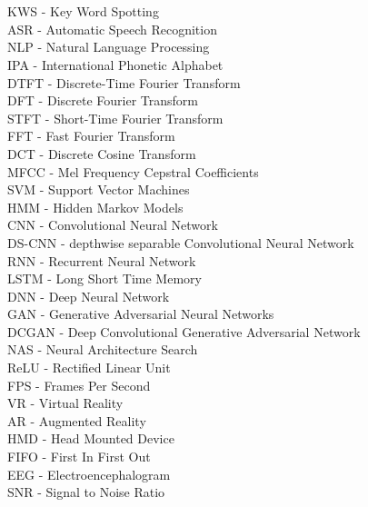 
\chapter*{}
KWS - Key Word Spotting\\
ASR - Automatic Speech Recognition\\
NLP - Natural Language Processing\\
IPA - International Phonetic Alphabet\\
%
DTFT - Discrete-Time Fourier Transform\\
DFT - Discrete Fourier Transform\\
STFT - Short-Time Fourier Transform\\
FFT - Fast Fourier Transform\\
DCT - Discrete Cosine Transform\\
MFCC - Mel Frequency Cepstral Coefficients\\
%
SVM - Support Vector Machines\\
HMM - Hidden Markov Models\\
%
CNN - Convolutional Neural Network\\
DS-CNN - depthwise separable Convolutional Neural Network\\
RNN - Recurrent Neural Network\\
LSTM - Long Short Time Memory\\
DNN - Deep Neural Network\\
GAN - Generative Adversarial Neural Networks\\
DCGAN - Deep Convolutional Generative Adversarial Network\\
NAS - Neural Architecture Search\\
ReLU - Rectified Linear Unit\\
%
FPS - Frames Per Second\\
VR - Virtual Reality\\
AR - Augmented Reality\\
HMD - Head Mounted Device\\
%
FIFO - First In First Out\\
%
EEG - Electroencephalogram\\
SNR - Signal to Noise Ratio\\
